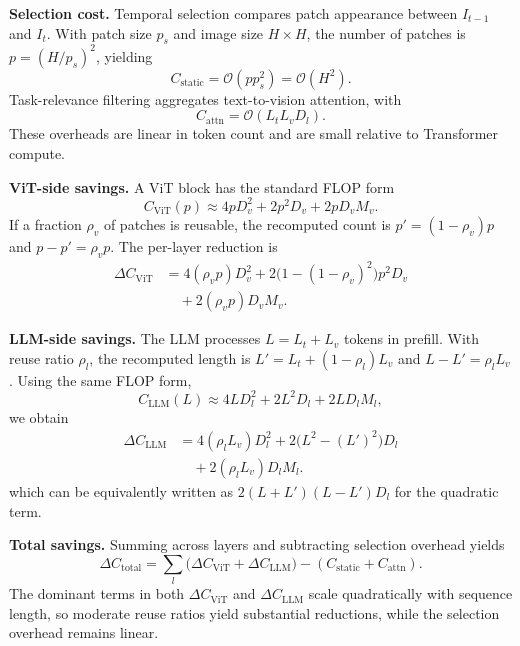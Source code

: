 \documentclass[11pt]{article}
\begin{document}
\textbf{Selection cost.} Temporal selection compares patch appearance between $I_{t-1}$ and $I_t$. With patch size $p_s$ and image size $H\times H$, the number of patches is $p=(H/p_s)^2$, yielding
\begin{equation}
    C_{\text{static}} = \mathcal{O}(p p_s^2) = \mathcal{O}(H^2).
    \label{eq:static_cost}
\end{equation}
Task-relevance filtering aggregates text-to-vision attention, with
\begin{equation}
    C_{\text{attn}} = \mathcal{O}(L_t L_v D_l).
    \label{eq:attn_filter}
\end{equation}
These overheads are linear in token count and are small relative to Transformer compute.

\textbf{ViT-side savings.} A ViT block has the standard FLOP form
\begin{equation}
    C_{\text{ViT}}(p) \approx 4 p D_v^2 + 2 p^2 D_v + 2 p D_v M_v.
    \label{eq:vit_flops}
\end{equation}
If a fraction $\rho_v$ of patches is reusable, the recomputed count is $p'=(1-\rho_v)p$ and $p-p'=\rho_v p$. The per-layer reduction is
\begin{equation}
\label{eq:vit_savings}
\begin{split}
    \Delta C_{\text{ViT}} &= 4(\rho_v p)D_v^2 + 2\big(1-(1-\rho_v)^2\big)p^2 D_v \\
    &\quad + 2(\rho_v p)D_v M_v.
\end{split}
\end{equation}

\textbf{LLM-side savings.} The LLM processes $L=L_t+L_v$ tokens in prefill. With reuse ratio $\rho_l$, the recomputed length is $L'=L_t+(1-\rho_l)L_v$ and $L-L'=\rho_l L_v$. Using the same FLOP form,
\begin{equation}
    C_{\text{LLM}}(L) \approx 4 L D_l^2 + 2 L^2 D_l + 2 L D_l M_l,
    \label{eq:llm_flops}
\end{equation}
we obtain
\begin{equation}
\label{eq:llm_savings}
\begin{split}
    \Delta C_{\text{LLM}} &= 4(\rho_l L_v)D_l^2 + 2\big(L^2-(L')^2\big)D_l \\
    &\quad + 2(\rho_l L_v)D_l M_l.
\end{split}
\end{equation}
which can be equivalently written as $2(L+L')(L-L')D_l$ for the quadratic term.

\textbf{Total savings.} Summing across layers and subtracting selection overhead yields
\begin{equation}
    \Delta C_{\text{total}} = \sum_l \big(\Delta C_{\text{ViT}} + \Delta C_{\text{LLM}}\big) - (C_{\text{static}} + C_{\text{attn}}).
    \label{eq:total_savings}
\end{equation}
The dominant terms in both $\Delta C_{\text{ViT}}$ and $\Delta C_{\text{LLM}}$ scale quadratically with sequence length, so moderate reuse ratios yield substantial reductions, while the selection overhead remains linear.
\end{document}
